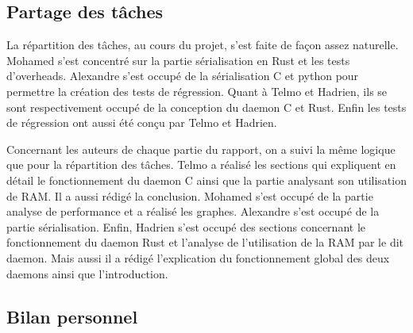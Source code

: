 \documentclass{article}
\begin{document}
\subsection{Partage des tâches}

La répartition des tâches, au cours du projet, s'est faite de façon assez naturelle. Mohamed s'est concentré sur la partie sérialisation en Rust et les tests d'overheads. Alexandre s'est occupé de la sérialisation C et python pour permettre la création des tests de régression. Quant à Telmo et Hadrien, ils se sont respectivement occupé de la conception du daemon C et Rust. Enfin les tests de régression ont aussi été conçu par Telmo et Hadrien.

Concernant les auteurs de chaque partie du rapport, on a suivi la même logique que pour la répartition des tâches. Telmo a réalisé les sections qui expliquent en détail le fonctionnement du daemon C ainsi que la partie analysant son utilisation de RAM. Il a aussi rédigé la conclusion. Mohamed s'est occupé de la partie analyse de performance et a réalisé les graphes. Alexandre s'est occupé de la partie sérialisation. Enfin, Hadrien s'est occupé des sections concernant le fonctionnement du daemon Rust et l'analyse de l'utilisation de la RAM par le dit daemon. Mais aussi il a rédigé l'explication du fonctionnement global des deux daemons ainsi que l'introduction.
\subsection{Bilan personnel}
\end{document}
